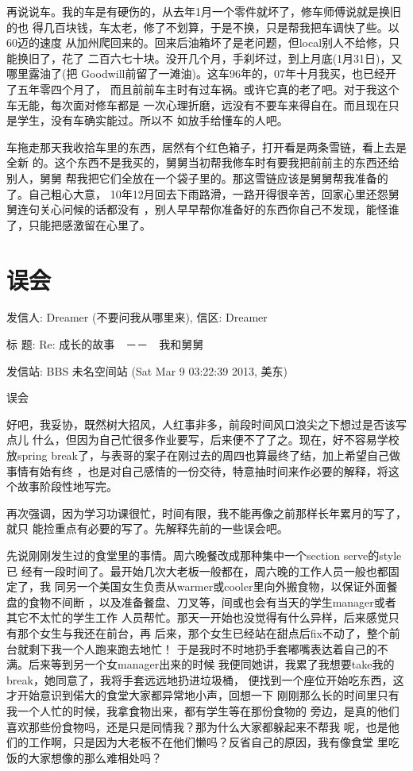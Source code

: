 \documentclass[12pt]{book}
\begin{document}
再说说车。我的车是有硬伤的，从去年1月一个零件就坏了，修车师傅说就是换旧的也
得几百块钱，车太老，修了不划算，于是不换，只是帮我把车调快了些。以60迈的速度
从加州爬回来的。回来后油箱坏了是老问题，但local别人不给修，只能换旧了，花了
二百六七十块。没开几个月，手刹坏过，到上月底(1月31日)，又哪里露油了(把
Goodwill前留了一滩油)。这车96年的，07年十月我买，也已经开了五年零四个月了，
而且前前车主时有过车祸。或许它真的老了吧。对于我这个车无能，每次面对修车都是
一次心理折磨，远没有不要车来得自在。而且现在只是学生，没有车确实能过。所以不
如放手给懂车的人吧。

车拖走那天我收拾车里的东西，居然有个红色箱子，打开看是两条雪链，看上去是全新
的。这个东西不是我买的，舅舅当初帮我修车时有要我把前前主的东西还给别人，舅舅
帮我把它们全放在一个袋子里的。那这雪链应该是舅舅帮我准备的了。自己粗心大意，
10年12月回去下雨路滑，一路开得很辛苦，回家心里还怨舅舅连句关心问候的话都没有
，别人早早帮你准备好的东西你自己不发现，能怪谁了，只能把感激留在心里了。
\section{误会}
\label{sec-12-3}

发信人: Dreamer (不要问我从哪里来), 信区: Dreamer

标  题: Re: 成长的故事　－－　我和舅舅

发信站: BBS 未名空间站 (Sat Mar  9 03:22:39 2013, 美东)

误会

好吧，我妥协，既然树大招风，人红事非多，前段时间风口浪尖之下想过是否该写点儿
什么，但因为自己忙很多作业要写，后来便不了了之。现在，好不容易学校放spring 
break了，与表哥的案子在刚过去的周四也算最终了结，加上希望自己做事情有始有终
，也是对自己感情的一份交待，特意抽时间来作必要的解释，将这个故事阶段性地写完。

再次强调，因为学习功课很忙，时间有限，我不能再像之前那样长年累月的写了，就只
能捡重点有必要的写了。先解释先前的一些误会吧。

先说刚刚发生过的食堂里的事情。周六晚餐改成那种集中一个section serve的style已
经有一段时间了。最开始几次大老板一般都在，周六晚的工作人员一般也都固定了，我
同另一个美国女生负责从warmer或cooler里向外搬食物，以保证外面餐盘的食物不间断
，以及准备餐盘、刀叉等，间或也会有当天的学生manager或者其它不太忙的学生工作
人员帮忙。那天一开始也没觉得有什么异样，后来感觉只有那个女生与我还在前台，再
后来，那个女生已经站在甜点后fix不动了，整个前台就剩下我一个人跑来跑去地忙！
于是我时不时地扔手套嘟嘴表达着自己的不满。后来等到另一个女manager出来的时候
我便同她讲，我累了我想要take我的break，她同意了，我将手套远远地扔进垃圾桶，
便找到一个座位开始吃东西，这才开始意识到偌大的食堂大家都异常地小声，回想一下
刚刚那么长的时间里只有我一个人忙的时候，我拿食物出来，都有学生等在那份食物的
旁边，是真的他们喜欢那些份食物吗，还是只是同情我？那为什么大家都躲起来不帮我
呢，也是他们的工作啊，只是因为大老板不在他们懒吗？反省自己的原因，我有像食堂
里吃饭的大家想像的那么难相处吗？
\end{document}
